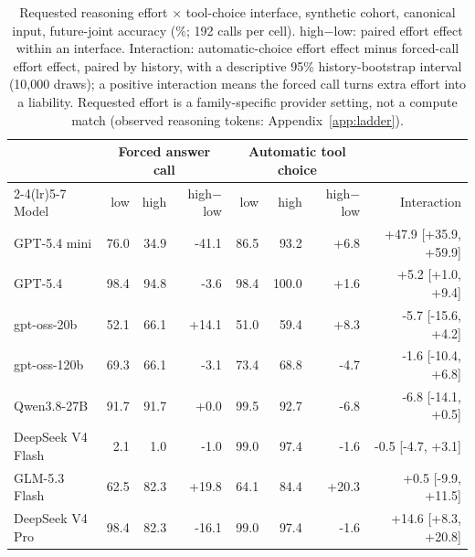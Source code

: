 \begin{table}[t]
\centering\footnotesize
\setlength{\tabcolsep}{3.5pt}
\begin{tabular}{lrrrrrrr}
\toprule
 & \multicolumn{3}{c}{Forced answer call} & \multicolumn{3}{c}{Automatic tool choice} & \\
\cmidrule(lr){2-4}\cmidrule(lr){5-7}
Model & low & high & high$-$low & low & high & high$-$low & Interaction \\
\midrule
GPT-5.4 mini & 76.0 & 34.9 & -41.1 & 86.5 & 93.2 & +6.8 & +47.9 [+35.9, +59.9] \\
GPT-5.4 & 98.4 & 94.8 & -3.6 & 98.4 & 100.0 & +1.6 & +5.2 [+1.0, +9.4] \\
gpt-oss-20b & 52.1 & 66.1 & +14.1 & 51.0 & 59.4 & +8.3 & -5.7 [-15.6, +4.2] \\
gpt-oss-120b & 69.3 & 66.1 & -3.1 & 73.4 & 68.8 & -4.7 & -1.6 [-10.4, +6.8] \\
Qwen3.8-27B & 91.7 & 91.7 & +0.0 & 99.5 & 92.7 & -6.8 & -6.8 [-14.1, +0.5] \\
DeepSeek V4 Flash & 2.1 & 1.0 & -1.0 & 99.0 & 97.4 & -1.6 & -0.5 [-4.7, +3.1] \\
GLM-5.3 Flash & 62.5 & 82.3 & +19.8 & 64.1 & 84.4 & +20.3 & +0.5 [-9.9, +11.5] \\
DeepSeek V4 Pro & 98.4 & 82.3 & -16.1 & 99.0 & 97.4 & -1.6 & +14.6 [+8.3, +20.8] \\
\bottomrule
\end{tabular}
\caption{Requested reasoning effort $\times$ tool-choice interface, synthetic cohort, canonical input, future-joint accuracy (\%; 192 calls per cell). high$-$low: paired effort effect within an interface. Interaction: automatic-choice effort effect minus forced-call effort effect, paired by history, with a descriptive 95\% history-bootstrap interval (10,000 draws); a positive interaction means the forced call turns extra effort into a liability. Requested effort is a family-specific provider setting, not a compute match (observed reasoning tokens: Appendix~\ref{app:ladder}).}
\label{tab:interaction_canonical}
\end{table}

